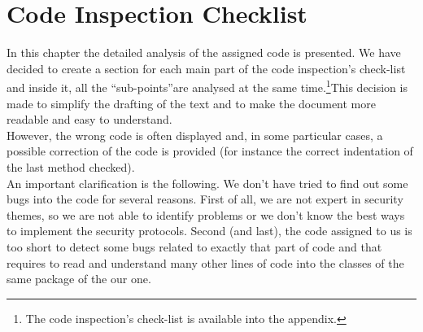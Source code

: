 \documentclass[\mainpath/main]{subfiles}
\begin{document}
\chapter{Code Inspection Checklist} %
\label{CodeInspectionChecklist}

\setmyfancystyle

In this chapter the detailed analysis of the assigned code is presented. We have decided to create a section for each main part of the code inspection's check-list and inside it, all the \textquotedblleft sub-points\textquotedblright are analysed at the same time.\footnote{The code inspection's check-list is available into the appendix.}This decision is made to simplify the drafting of the text and to make the document more readable and easy to understand.\\
However, the wrong code is often displayed and, in some particular cases, a possible correction of the code is provided (for instance the correct indentation of the last method checked).\\
An important clarification is the following. We don't have tried to find out some bugs into the code for several reasons. First of all, we are not expert in security themes, so we are not able to identify problems or we don't know the best ways to implement the security protocols. Second (and last), the code assigned to us is too short to detect some bugs related to exactly that part of code and that requires to read and understand many other lines of code into the classes of the same package of the our one.\\
\end{document}
